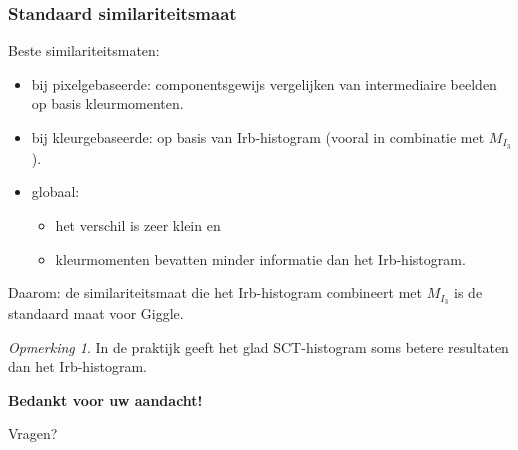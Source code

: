 \documentclass[dutch]{beamer}
\theoremstyle{definition}
\theoremstyle{remark}
\newtheorem{opmerking}[theorem]{Opmerking}
\theoremstyle{example}
\begin{document}
{
	\frametitle{Standaard similariteitsmaat}
	
	Beste similariteitsmaten:
	\begin{itemize}
      \item bij pixelgebaseerde: componentsgewijs vergelijken van intermediaire
      beelden op basis kleurmomenten.
      \item bij kleurgebaseerde: op basis van Irb-histogram (vooral in combinatie
      met $M_{I_3}$). 
      \item globaal:
      \begin{itemize}
        \item het verschil is zeer klein en
        \item kleurmomenten bevatten minder informatie dan het Irb-histogram.
      \end{itemize}
    \end{itemize}
    Daarom: de similariteitsmaat die het Irb-histogram combineert met $M_{I_3}$
    is de standaard maat voor Giggle.
    
    \begin{opmerking}
    In de praktijk geeft het glad SCT-histogram soms betere resultaten dan
    het Irb-histogram.
    \end{opmerking}
}


\plainframe
{
  \begin{center}
  \Huge \textbf{\color{white}Bedankt voor uw aandacht!}
  \end{center}
  \vspace{10pt}
  \begin{center}
  \LARGE Vragen?
  \end{center}
}
\end{document}
